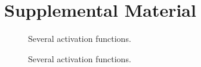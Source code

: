 \documentclass[11pt,a4paper]{article}
\begin{document}




\appendix

\section{Supplemental Material}

\begin{figure}[!htb]
\scalebox{0.5}{
}
\scalebox{0.5}{

}
\caption{Several activation functions.}
\label{fig:saturating}
\end{figure}

\begin{figure}[!htb]
\scalebox{0.5}{
}
\scalebox{0.5}{

}
\caption{Several activation functions.}
\label{fig:nonsaturating}
\end{figure}
\end{document}
